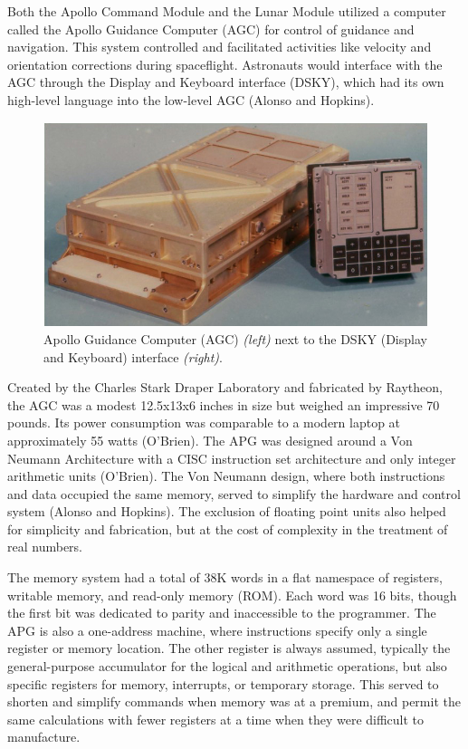 \documentclass[a4paper,11pt]{article}
\begin{document}
Both the Apollo Command Module and the Lunar Module utilized a computer called the Apollo Guidance Computer (AGC) for control of guidance and navigation.  This system controlled and facilitated activities like velocity and orientation corrections during spaceflight.  Astronauts would interface with the AGC through the Display and Keyboard interface (DSKY), which had its own high-level language into the low-level AGC (Alonso and Hopkins).

\begin{figure}[h!]
\caption{Apollo Guidance Computer (AGC) {\it (left)} next to the DSKY (Display and Keyboard) interface {\it (right)}.} 
\centering
\includegraphics[width=.8\textwidth]{Agc_view.jpg} 
\end{figure}
\vspace{0.02cm}

Created by the Charles Stark Draper Laboratory and fabricated by Raytheon, the AGC was a modest 12.5x13x6 inches in size but weighed an impressive 70 pounds.  Its power consumption was comparable to a modern laptop at approximately 55 watts (O'Brien).  The APG was designed around a Von Neumann Architecture with a CISC instruction set architecture and only integer arithmetic units (O'Brien).  The Von Neumann design, where both instructions and data occupied the same memory, served to simplify the hardware and control system (Alonso and Hopkins). The exclusion of floating point units also helped for simplicity and fabrication, but at the cost of complexity in the treatment of real numbers.  

The memory system had a total of 38K words in a flat namespace of registers, writable memory, and read-only memory (ROM).  Each word was 16 bits, though the first bit was dedicated to parity and inaccessible to the programmer.  The APG is also a one-address machine, where instructions specify only a single register or memory location.  The other register is always assumed, typically the general-purpose accumulator for the logical and arithmetic operations, but also specific registers for memory, interrupts, or temporary storage.  This served to shorten and simplify commands when memory was at a premium, and permit the same calculations with fewer registers at a time when they were difficult to manufacture.  
\end{document}

